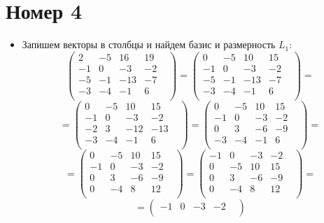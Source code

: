 \documentclass[a4paper,12pt]{article}
\begin{document}
\section*{Номер 4}
\begin{itemize}
\item
Запишем векторы в столбцы и найдем базис и размерность $L_1$:
\[
\begin{pmatrix}
2 & -5 & 16 & 19 & \\
-1 & 0 & -3 & -2 & \\
-5 & -1 & -13 & -7 & \\
-3 & -4 & -1 & 6 & \\
\end{pmatrix}
=
\begin{pmatrix}
0 & -5 & 10 & 15 & \\
-1 & 0 & -3 & -2 & \\
-5 & -1 & -13 & -7 & \\
-3 & -4 & -1 & 6 & \\
\end{pmatrix}
=
\]
\[
=
\begin{pmatrix}
0 & -5 & 10 & 15 & \\
-1 & 0 & -3 & -2 & \\
-2 & 3 & -12 & -13 & \\
-3 & -4 & -1 & 6 & \\
\end{pmatrix}
=
\begin{pmatrix}
0 & -5 & 10 & 15 & \\
-1 & 0 & -3 & -2 & \\
0 & 3 & -6 & -9 & \\
-3 & -4 & -1 & 6 & \\
\end{pmatrix}
=
\]
\[
=
\begin{pmatrix}
0 & -5 & 10 & 15 & \\
-1 & 0 & -3 & -2 & \\
0 & 3 & -6 & -9 & \\
0 & -4 & 8 & 12 & \\
\end{pmatrix}
=
\begin{pmatrix}
-1 & 0 & -3 & -2 & \\
0 & -5 & 10 & 15 & \\
0 & 3 & -6 & -9 & \\
0 & -4 & 8 & 12 & \\
\end{pmatrix}
=
\]
\[
=
\begin{pmatrix}
-1 & 0 & -3 & -2 & \\

\end{pmatrix}\]
\end{itemize}
\end{document}

